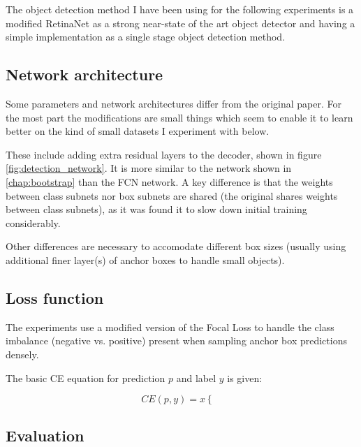 {The object detection method I have been using for the following experiments is a modified RetinaNet \cite{Lin2017} as a strong near-state of the art object detector and having a simple implementation as a single stage object detection method. 






\subsection {Network architecture}
\label{sec:architecture}


Some parameters and network architectures differ from the original paper. For the most part the modifications are small things which seem to enable it to learn better on the kind of small datasets I experiment with below. 

These include adding extra residual layers to the decoder, shown in figure \ref{fig:detection_network}. It is more similar to the network shown in  \ref{chap:bootstrap} than the \gls{FCN} network. A key difference is that the weights between class subnets nor box subnets are shared (the original shares weights between class subnets), as it was found it to slow down initial training considerably. 


Other differences are necessary to accomodate different box sizes (usually using additional finer layer(s) of anchor boxes to handle small objects).

\subsection {Loss function}
\label{sec:loss}


The experiments use a modified version of the Focal Loss \cite{Lin2017} to handle the class imbalance (negative vs. positive) present when sampling anchor box predictions densely.

The basic \gls{CE} equation for prediction $p$ and label $y$ is given:

\begin{equation}
CE(p, y) = x
  \begin{cases}
  \end{cases}
\label{eq:cross_entropy}
\end{equation}



\subsection {Evaluation}
\label{sec:evaluation}



}
